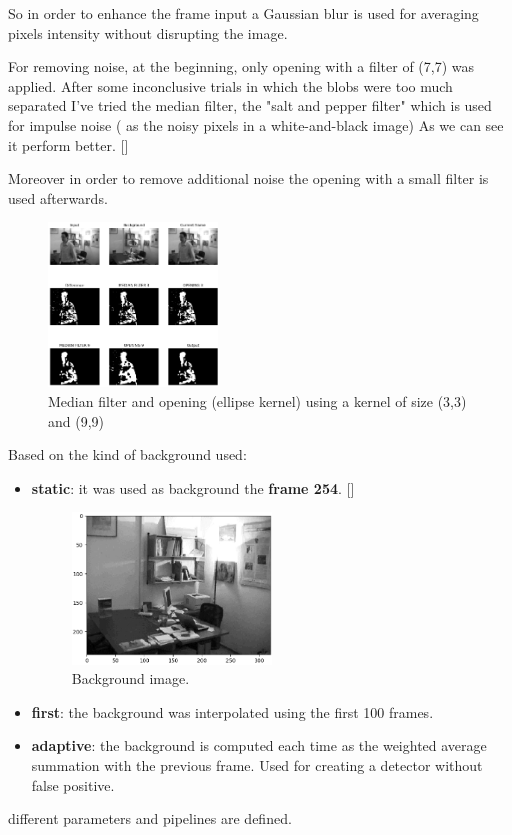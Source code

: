 \documentclass{article}
\newcommand{\CREF}[1]{[\hyperref[#1]{\Cref{#1}}]}
\begin{document}
So in order to enhance the frame input a Gaussian blur is used for averaging pixels intensity without disrupting the image.


For removing noise, at the beginning, only opening with a filter of (7,7) was applied.
After some inconclusive trials in which the blobs were too much separated I've tried the median filter, the "salt and pepper filter" which is used for impulse noise ( as the noisy pixels in a white-and-black image)
As we can see it perform better. \CREF{medfilter}

Moreover in order to remove additional noise the opening with a small filter is used afterwards.
\begin{figure}
    \centering
    \includegraphics[width=0.4\textwidth,keepaspectratio]{median filter.png}
    \caption{Median filter and opening (ellipse kernel) using a kernel of size (3,3) and (9,9) }
    \label{medfilter}
\end{figure}


Based on the kind of background used:
    \begin{itemize}
        \item \textbf{static}: it was used as background the \textbf{frame 254}. \CREF{bg}
              \begin{figure}[ht]
                  \centering
                  \includegraphics[width=0.5\textwidth,keepaspectratio]{bg.png}
                  \caption{Background image.\label{bg}}
              \end{figure}
        \item \textbf{first}: the background was interpolated using the first 100 frames.
        \item \textbf{adaptive}: the background is computed each time as the weighted average summation with the previous frame. Used for creating a detector without false positive.
    \end{itemize}  
different parameters and pipelines are defined.
\end{document}
